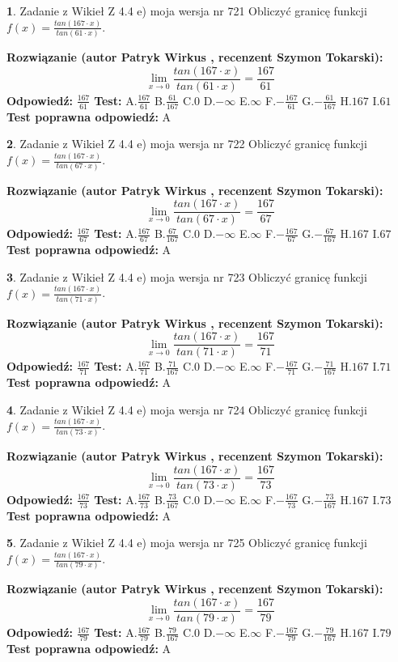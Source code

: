\documentclass[12pt, a4paper]{article}
\theoremstyle{definition} %
\newtheorem{zad}{}
\newcommand{\zadStart}[1]{\begin{zad}#1\newline}
\newcommand{\zadStop}{\end{zad}}
\newcommand{\rozwStart}[2]{\noindent \textbf{Rozwiązanie (autor #1 , recenzent #2): }\newline}
\newcommand{\rozwStop}{\newline}
\newcommand{\odpStart}{\noindent \textbf{Odpowiedź:}\newline}
\newcommand{\odpStop}{\newline}
\newcommand{\testStart}{\noindent \textbf{Test:}\newline}
\newcommand{\testStop}{\newline}
\newcommand{\kluczStart}{\noindent \textbf{Test poprawna odpowiedź:}\newline}
\newcommand{\kluczStop}{\newline}
\begin{document}
\zadStart{Zadanie z Wikieł Z 4.4 e) moja wersja nr 721}
Obliczyć granicę funkcji $f(x)=\frac{tan(167\cdot x)}{tan(61\cdot x)}$.
\zadStop
\rozwStart{Patryk Wirkus}{Szymon Tokarski}
$$\lim\limits_{x\to 0}\frac{tan(167\cdot x)}{tan(61\cdot x)}=
\frac{167}{61}$$
\rozwStop
\odpStart
$\frac{167}{61}$
\odpStop
\testStart
A.$\frac{167}{61}$
B.$\frac{61}{167}$
C.$0$
D.$-\infty$
E.$\infty$
F.$-\frac{167}{61}$
G.$-\frac{61}{167}$
H.$167$
I.$61$
\testStop
\kluczStart
A
\kluczStop



\zadStart{Zadanie z Wikieł Z 4.4 e) moja wersja nr 722}
Obliczyć granicę funkcji $f(x)=\frac{tan(167\cdot x)}{tan(67\cdot x)}$.
\zadStop
\rozwStart{Patryk Wirkus}{Szymon Tokarski}
$$\lim\limits_{x\to 0}\frac{tan(167\cdot x)}{tan(67\cdot x)}=
\frac{167}{67}$$
\rozwStop
\odpStart
$\frac{167}{67}$
\odpStop
\testStart
A.$\frac{167}{67}$
B.$\frac{67}{167}$
C.$0$
D.$-\infty$
E.$\infty$
F.$-\frac{167}{67}$
G.$-\frac{67}{167}$
H.$167$
I.$67$
\testStop
\kluczStart
A
\kluczStop



\zadStart{Zadanie z Wikieł Z 4.4 e) moja wersja nr 723}
Obliczyć granicę funkcji $f(x)=\frac{tan(167\cdot x)}{tan(71\cdot x)}$.
\zadStop
\rozwStart{Patryk Wirkus}{Szymon Tokarski}
$$\lim\limits_{x\to 0}\frac{tan(167\cdot x)}{tan(71\cdot x)}=
\frac{167}{71}$$
\rozwStop
\odpStart
$\frac{167}{71}$
\odpStop
\testStart
A.$\frac{167}{71}$
B.$\frac{71}{167}$
C.$0$
D.$-\infty$
E.$\infty$
F.$-\frac{167}{71}$
G.$-\frac{71}{167}$
H.$167$
I.$71$
\testStop
\kluczStart
A
\kluczStop



\zadStart{Zadanie z Wikieł Z 4.4 e) moja wersja nr 724}
Obliczyć granicę funkcji $f(x)=\frac{tan(167\cdot x)}{tan(73\cdot x)}$.
\zadStop
\rozwStart{Patryk Wirkus}{Szymon Tokarski}
$$\lim\limits_{x\to 0}\frac{tan(167\cdot x)}{tan(73\cdot x)}=
\frac{167}{73}$$
\rozwStop
\odpStart
$\frac{167}{73}$
\odpStop
\testStart
A.$\frac{167}{73}$
B.$\frac{73}{167}$
C.$0$
D.$-\infty$
E.$\infty$
F.$-\frac{167}{73}$
G.$-\frac{73}{167}$
H.$167$
I.$73$
\testStop
\kluczStart
A
\kluczStop



\zadStart{Zadanie z Wikieł Z 4.4 e) moja wersja nr 725}
Obliczyć granicę funkcji $f(x)=\frac{tan(167\cdot x)}{tan(79\cdot x)}$.
\zadStop
\rozwStart{Patryk Wirkus}{Szymon Tokarski}
$$\lim\limits_{x\to 0}\frac{tan(167\cdot x)}{tan(79\cdot x)}=
\frac{167}{79}$$
\rozwStop
\odpStart
$\frac{167}{79}$
\odpStop
\testStart
A.$\frac{167}{79}$
B.$\frac{79}{167}$
C.$0$
D.$-\infty$
E.$\infty$
F.$-\frac{167}{79}$
G.$-\frac{79}{167}$
H.$167$
I.$79$
\testStop
\kluczStart
A
\kluczStop
\end{document}
